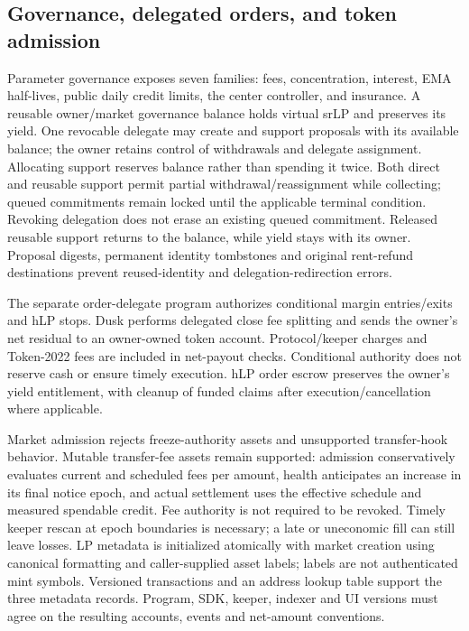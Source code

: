 \subsection{Governance, delegated orders, and token admission}

Parameter governance exposes seven families: fees, concentration, interest, EMA half-lives, public daily credit limits, the center controller, and insurance. A reusable owner/market governance balance holds virtual srLP and preserves its yield. One revocable delegate may create and support proposals with its available balance; the owner retains control of withdrawals and delegate assignment. Allocating support reserves balance rather than spending it twice. Both direct and reusable support permit partial withdrawal/reassignment while collecting; queued commitments remain locked until the applicable terminal condition. Revoking delegation does not erase an existing queued commitment. Released reusable support returns to the balance, while yield stays with its owner. Proposal digests, permanent identity tombstones and original rent-refund destinations prevent reused-identity and delegation-redirection errors.

The separate order-delegate program authorizes conditional margin entries/exits and hLP stops. Dusk performs delegated close fee splitting and sends the owner's net residual to an owner-owned token account. Protocol/keeper charges and Token-2022 fees are included in net-payout checks. Conditional authority does not reserve cash or ensure timely execution. hLP order escrow preserves the owner's yield entitlement, with cleanup of funded claims after execution/cancellation where applicable.

Market admission rejects freeze-authority assets and unsupported transfer-hook behavior. Mutable transfer-fee assets remain supported: admission conservatively evaluates current and scheduled fees per amount, health anticipates an increase in its final notice epoch, and actual settlement uses the effective schedule and measured spendable credit. Fee authority is not required to be revoked. Timely keeper rescan at epoch boundaries is necessary; a late or uneconomic fill can still leave losses. LP metadata is initialized atomically with market creation using canonical formatting and caller-supplied asset labels; labels are not authenticated mint symbols. Versioned transactions and an address lookup table support the three metadata records. Program, SDK, keeper, indexer and UI versions must agree on the resulting accounts, events and net-amount conventions.

